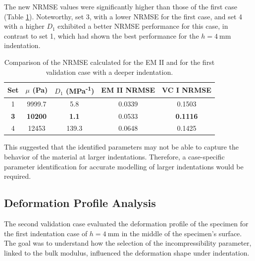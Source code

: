 The new NRMSE values were significantly higher than those of the first case (Table \ref{tab:nrmse8mm}). 
Noteworthy, set \SI{3}{}, with a lower NRMSE for the first case, and set \SI{4}{} with a higher $D_1$ 
exhibited a better NRMSE performance for this case, in contrast to set \SI{1}{}, which had shown 
the best performance for the $h=\SI{4}{\milli \meter}$ indentation.\\

\begin{table}[ht!]
    \centering
    \begin{tabular}{|c|c|c|c|c|}
    \hline
    Set & $\mu$ (Pa) & $D_1$ (MPa\textsuperscript{-1}) & EM II NRMSE & VC I NRMSE\\
    \hline
    1 & 9999.7 & 5.8 & 0.0339 & 0.1503\\
    \textbf{3} & \textbf{10200} & \textbf{1.1} & 0.0533 & \textbf{0.1116}\\
    4 & 12453 & 139.3 & 0.0648 & 0.1425\\
    \hline
    \end{tabular}
    \caption[NRMSE for first validation case]{Comparison of the NRMSE calculated for the EM II and for the first validation case with a deeper indentation.}
	\label{tab:nrmse8mm}
\end{table}

This suggested that the identified parameters may not be able to capture the behavior 
of the material at larger indentations. Therefore, a case-specific parameter identification
for accurate modelling of larger indentations would be required.\\

\subsection{Deformation Profile Analysis}
\label{subsection:defprofanalysis}
The second validation case evaluated the deformation profile of the specimen for the first 
indentation case of $h=\SI{4}{\milli \meter}$ in the middle of the specimen's surface. The goal 
was to understand how the selection of the incompressibility parameter, linked to the 
bulk modulus, influenced the deformation shape under indentation.\\

